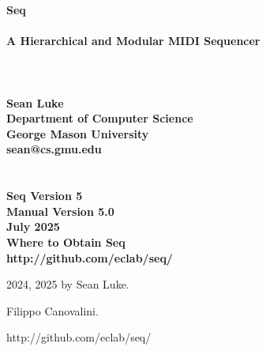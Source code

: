 \documentclass[twoside,10pt]{article}
\newcommand\booktitle{Seq\\~\vspace{0em}\\\LARGE A Hierarchical and Modular MIDI Sequencer\\}
\newcommand\reference[1]{\vspace{0.5em}\hfill{\parbox{6in}{\raggedleft\noindent\textsf{#1}}}}
\begin{document}

\noindent\Huge\bf \booktitle\\
\\
\\
\Large\bf Sean Luke\\
{\large\rm 
Department of Computer Science\\
George Mason University\\
sean@cs.gmu.edu}\\
\\
\\
\large\rm {\bf Seq Version 5}\\
\large\rm {\bf Manual Version 5.0}\\
\large\rm  July 2025\\

\vspace{5in}
\noindent\Large\bf Where to Obtain Seq\\
\large\rm http:/\!/github.com/eclab/seq/

\clearpage

\small 
{}  2024, 2025 by Sean Luke.

\vspace{0.25in}
 Filippo Canovalini.

\vspace{0.25in}


\reference{http:/\!/github.com/eclab/seq/}

\vspace{0.15in}
\end{document}
